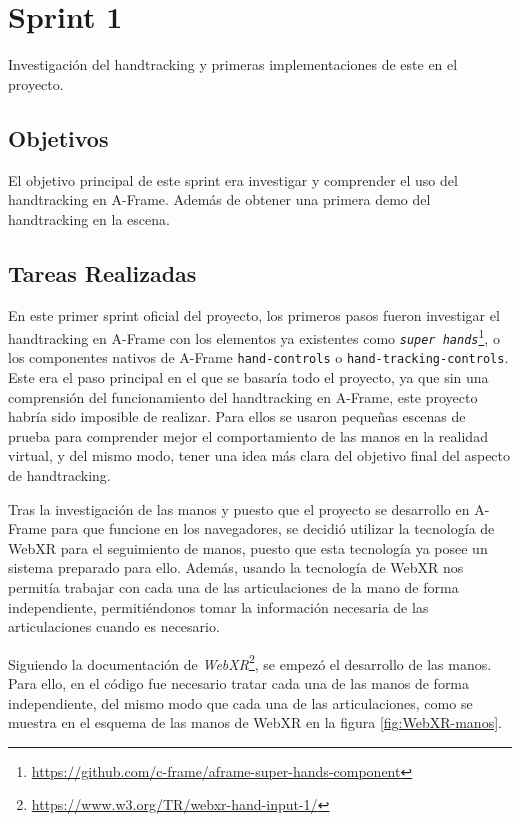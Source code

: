 \documentclass[a4paper, 12pt]{book}
\begin{document}
\section{Sprint 1}
\label{sec:sprint1}
Investigación del handtracking y primeras implementaciones de este en el proyecto.

\subsection{Objetivos}
\label{subsec:objetivo-principal1}
El objetivo principal de este sprint era investigar y comprender el uso del handtracking en A-Frame. 
Además de obtener una primera demo del handtracking en la escena.

\subsection{Tareas Realizadas}
\label{subsec:implementacion1}
En este primer sprint oficial del proyecto, los primeros pasos fueron investigar el handtracking en A-Frame con los elementos ya existentes como \textit{\texttt{super hands}}\footnote{\url{https://github.com/c-frame/aframe-super-hands-component}}, o los componentes nativos de A-Frame \texttt{hand-controls} o \texttt{hand-tracking-controls}. Este era el paso principal en el que se basaría todo el proyecto, ya que sin una comprensión del funcionamiento del handtracking en A-Frame, este proyecto habría sido imposible de realizar.
Para ellos se usaron pequeñas escenas de prueba para comprender mejor el comportamiento de las manos en la realidad virtual, y del mismo modo, tener una idea más clara del objetivo final del aspecto de handtracking. 

Tras la investigación de las manos y puesto que el proyecto se desarrollo en A-Frame para que funcione en los navegadores, se decidió utilizar la tecnología de WebXR para el seguimiento de manos, puesto que esta tecnología ya posee un sistema preparado para ello. Además, usando la tecnología de WebXR nos permitía trabajar con cada una de las articulaciones de la mano de forma independiente, permitiéndonos tomar la información necesaria de las articulaciones cuando es necesario. 

Siguiendo la documentación de \textit{WebXR}\footnote{\url{https://www.w3.org/TR/webxr-hand-input-1/}}, se empezó el desarrollo de las manos. Para ello, en el código fue necesario tratar cada una de las manos de forma independiente, del mismo modo que cada una de las articulaciones, como se muestra en el esquema de las manos de WebXR en la figura \ref{fig:WebXR-manos}. 
\end{document}
